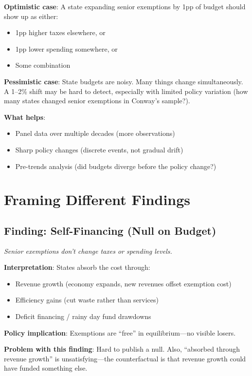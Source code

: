 \documentclass[11pt]{article}
\begin{document}
\textbf{Optimistic case}: A state expanding senior exemptions by 1pp of budget should show up as either:
\begin{itemize}
    \item 1pp higher taxes elsewhere, or
    \item 1pp lower spending somewhere, or
    \item Some combination
\end{itemize}

\textbf{Pessimistic case}: State budgets are noisy. Many things change simultaneously. A 1--2\% shift may be hard to detect, especially with limited policy variation (how many states changed senior exemptions in Conway's sample?).

\textbf{What helps}:
\begin{itemize}
    \item Panel data over multiple decades (more observations)
    \item Sharp policy changes (discrete events, not gradual drift)
    \item Pre-trends analysis (did budgets diverge before the policy change?)
\end{itemize}

\section{Framing Different Findings}

\subsection{Finding: Self-Financing (Null on Budget)}

\textit{Senior exemptions don't change taxes or spending levels.}

\textbf{Interpretation}: States absorb the cost through:
\begin{itemize}
    \item Revenue growth (economy expands, new revenues offset exemption cost)
    \item Efficiency gains (cut waste rather than services)
    \item Deficit financing / rainy day fund drawdowns
\end{itemize}

\textbf{Policy implication}: Exemptions are ``free'' in equilibrium---no visible losers.

\textbf{Problem with this finding}: Hard to publish a null. Also, ``absorbed through revenue growth'' is unsatisfying---the counterfactual is that revenue growth could have funded something else.
\end{document}
